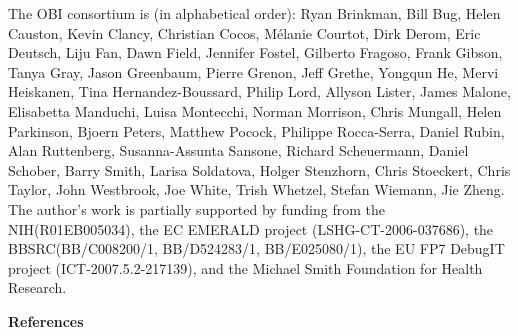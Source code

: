 \documentclass[a4paper,10pt,twocolumn]{article}
\begin{document}
The OBI consortium is (in alphabetical order): Ryan Brinkman, Bill Bug, Helen Causton, Kevin Clancy, Christian Cocos, M\'elanie Courtot, Dirk Derom, Eric Deutsch, Liju Fan, Dawn Field, Jennifer Fostel, Gilberto Fragoso, Frank Gibson, Tanya Gray, Jason Greenbaum, Pierre Grenon, Jeff Grethe, Yongqun He, Mervi Heiskanen, Tina Hernandez-Boussard, Philip Lord, Allyson Lister, James Malone, Elisabetta Manduchi, Luisa Montecchi, Norman Morrison, Chris Mungall, Helen Parkinson, Bjoern Peters, Matthew Pocock, Philippe Rocca-Serra, Daniel Rubin, Alan Ruttenberg, Susanna-Assunta Sansone, Richard Scheuermann, Daniel Schober, Barry Smith, Larisa Soldatova, Holger Stenzhorn, Chris Stoeckert, Chris Taylor, John Westbrook,  Joe White, Trish Whetzel, Stefan Wiemann, Jie Zheng. 
The author’s work is partially supported by funding from the NIH(R01EB005034), the EC EMERALD project (LSHG-CT-2006-037686), the BBSRC(BB/C008200/1, BB/D524283/1, BB/E025080/1), the EU FP7 DebugIT project (ICT-2007.5.2-217139), and the Michael Smith Foundation for Health Research.

   

{\def\section*#1{}
\begin{center}
\textbf{References}
\end{center}
\begin{small}

\end{small}
}
  
    \balance
    
\begin{acronym}




\end{acronym}
\end{document}

